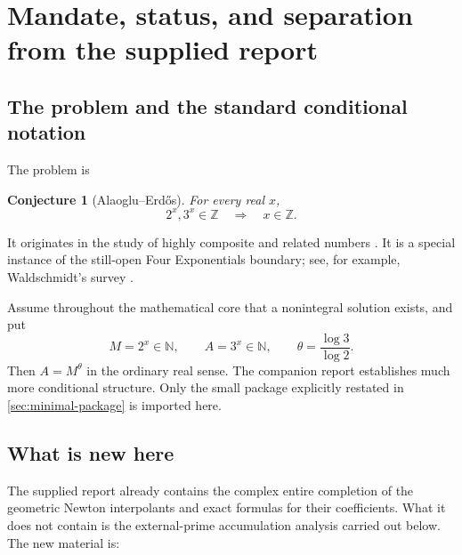 \documentclass[11pt,oneside]{article}
\newtheorem{conjecture}[theorem]{Conjecture}
\theoremstyle{definition}
\newcommand{\N}{\mathbb N}
\newcommand{\Z}{\mathbb Z}
\begin{document}
\tableofcontents
\newpage

\section{Mandate, status, and separation from the supplied report}

\subsection{The problem and the standard conditional notation}

The problem is
\begin{conjecture}[Alaoglu--Erd\H{o}s]\label{conj:AE}
For every real $x$,
\[
 2^x,3^x\in\Z \quad\Longrightarrow\quad x\in\Z.
\]
\end{conjecture}
It originates in the study of highly composite and related numbers
\cite{AE1944}.  It is a special instance of the still-open Four Exponentials boundary;
see, for example, Waldschmidt's survey \cite{Waldschmidt2023}.

Assume throughout the mathematical core that a nonintegral solution exists, and put
\begin{equation}\label{eq:MA}
 M=2^x\in\N,\qquad A=3^x\in\N,
 \qquad
 \theta=\frac{\log3}{\log2}.
\end{equation}
Then $A=M^\theta$ in the ordinary real sense.  The companion report
\cite{Unified2026} establishes much more conditional structure.  Only the small package
explicitly restated in \cref{sec:minimal-package} is imported here.

\subsection{What is new here}

The supplied report already contains the complex entire completion of the geometric Newton
interpolants and exact formulas for their coefficients.  What it does not contain is the
external-prime accumulation analysis carried out below.  The new material is:
\end{document}
